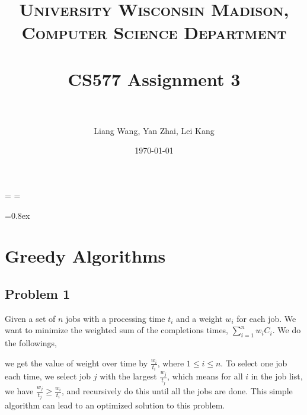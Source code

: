 \documentclass[paper=a4, fontsize=11pt]{scrartcl} %
\title{	
\normalfont \normalsize 
\textsc{University Wisconsin Madison, Computer Science Department} \\ [25pt] %
\horrule{0.5pt} \\[0.4cm] %
\huge CS577 Assignment 3\\ %
\horrule{2pt} \\[0.5cm] %
}
\author{Liang Wang, Yan Zhai, Lei Kang} %
\date{\normalsize\today} %
\numberwithin{equation}{section} %
\numberwithin{figure}{section} %
\numberwithin{table}{section} %
\begin{document}
\maketitle %

\singlespacing
\newdimen\origiwspc%
\newdimen\origiwstr%
\origiwspc=\font%
\origiwstr=\font

\font=0.8ex

\section*{Greedy Algorithms}

\subsection*{Problem 1}

Given a set of $n$ jobs with a processing time $t_i$ and a weight $w_i$ for each job. We want to minimize the weighted sum of the completions times, $\sum_{i=1}^{n} {w_iC_i}$. We do the followings,

we get the value of weight over time by $\frac{w_i}{t_i}$, where $1 \leq i \leq n$. To select one job each time, we select job $j$ with the largest $\frac{w_j}{t_j}$, which means for all $i$ in the job list, we have $\frac{w_j}{t_j} \geq \frac{w_i}{t_i}$, and recursively do this until all the jobs are done. This simple algorithm can lead to an optimized solution to this problem.
\end{document}
